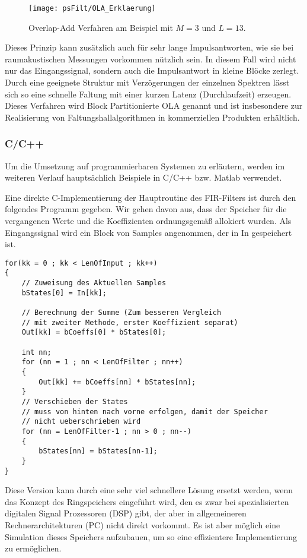 \begin{figure}[H]
\begin{center}
\texttt{[image: psFilt/OLA\_Erklaerung]}
\caption{\label{pic:OLA:Erklaerung}Overlap-Add Verfahren am Beispiel mit $M = 3$ und $L = 13$.}
\end{center}
\end{figure}

Dieses Prinzip kann zusätzlich auch für sehr lange Impulsantworten, wie sie bei raumakustischen
Messungen vorkommen nützlich sein. In diesem Fall wird nicht nur das Eingangssignal, sondern auch
die Impulsantwort in kleine Blöcke zerlegt. Durch eine geeignete Struktur mit Verzögerungen der
einzelnen Spektren lässt sich so eine schnelle Faltung mit einer kurzen Latenz
(Durchlaufzeit) erzeugen. Dieses Verfahren wird Block Partitionierte OLA genannt und
ist insbesondere zur Realisierung von Faltungshallalgorithmen in kommerziellen Produkten erhältlich.

\subsubsection{C/C++}
Um die Umsetzung auf programmierbaren Systemen zu erläutern,
werden im weiteren Verlauf hauptsächlich Beispiele in C/C++ bzw.
Matlab verwendet.

Eine direkte C-Implementierung der Hauptroutine des FIR-Filters
ist durch den folgendes Programm gegeben. Wir gehen davon aus,
dass der Speicher für die vergangenen Werte und die Koeffizienten
ordnungsgemäß allokiert wurden. Als Eingangssignal wird ein Block
von Samples angenommen, der in In gespeichert ist.
\begin{verbatim}
for(kk = 0 ; kk < LenOfInput ; kk++)
{
    // Zuweisung des Aktuellen Samples
    bStates[0] = In[kk];

    // Berechnung der Summe (Zum besseren Vergleich
    // mit zweiter Methode, erster Koeffizient separat)
    Out[kk] = bCoeffs[0] * bStates[0];

    int nn;
    for (nn = 1 ; nn < LenOfFilter ; nn++)
    {
        Out[kk] += bCoeffs[nn] * bStates[nn];
    }
    // Verschieben der States
    // muss von hinten nach vorne erfolgen, damit der Speicher
    // nicht ueberschrieben wird
    for (nn = LenOfFilter-1 ; nn > 0 ; nn--)
    {
        bStates[nn] = bStates[nn-1];
    }
}
\end{verbatim}

Diese Version kann durch eine sehr viel schnellere Lösung ersetzt werden, wenn das
Konzept des Ringspeichers eingeführt wird, den es zwar bei spezialisierten digitalen Signal
Prozessoren (DSP) gibt, der aber in allgemeineren Rechnerarchitekturen (PC) nicht direkt vorkommt. Es
ist aber möglich eine Simulation dieses Speichers aufzubauen, um so eine effizientere
Implementierung zu ermöglichen.

